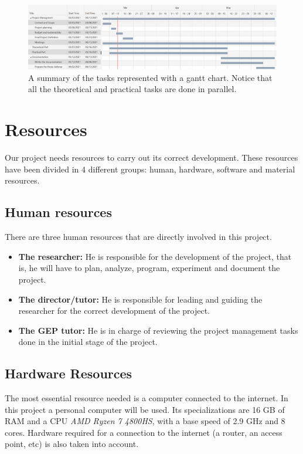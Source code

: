 \begin{figure}[H]
    \centering
    \includegraphics[scale=0.35]{gantt.png}
    \caption{A summary of the tasks represented with a gantt chart. Notice that all the theoretical and practical tasks are done in parallel.}
    \label{fig:gantt}
\end{figure}

\section{Resources}

Our project needs resources to carry out its correct development. These resources have been divided in 4 different groups: human, hardware, software and material resources.

\subsection{Human resources}
\label{sec:human_resources}

There are three human resources that are directly involved in this project.

\begin{itemize}
    \item \textbf{The researcher:} He is responsible for the development of the project, that is, he will have to plan, analyze, program, experiment and document the project.
    \item \textbf{The director/tutor:} He is responsible for leading and guiding the researcher for the correct development of the project.
    \item \textbf{The GEP tutor:} He is in charge of reviewing the project management tasks done in the initial stage of the project.
\end{itemize}

\subsection{Hardware Resources}
\label{sec:hardware_resources}

The most essential resource needed is a computer connected to the internet. In this project a personal computer will be used. Its specializations are 16 GB of RAM and a CPU \emph{AMD Ryzen 7 4800HS}, with a base speed of 2.9 GHz and 8 cores. Hardware required for a connection to the internet (a router, an access point, etc) is also taken into account.

